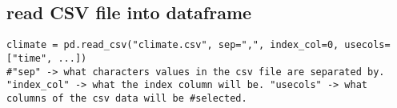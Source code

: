 \subsection{read CSV file into dataframe}
\begin{lstlisting}
climate = pd.read_csv("climate.csv", sep=",", index_col=0, usecols=["time", ...])
#"sep" -> what characters values in the csv file are separated by. "index_col" -> what the index column will be. "usecols" -> what columns of the csv data will be #selected.
\end{lstlisting}